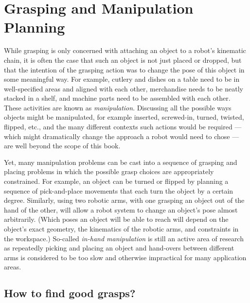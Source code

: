 \chapter{Grasping and Manipulation Planning}\label{chap:manipulation}

While grasping is only concerned with attaching an object to a robot's kinematic chain, it is often the case that such an object is not just placed or dropped, but that the intention of the grasping action was to change the pose of this object in some meaningful way. For example, cutlery and dishes on a table need to be in well-specified areas and aligned with each other, merchandise needs to be neatly stacked in a shelf, and machine parts need to be assembled with each other. These activities are known as \textsl{manipulation}. Discussing all the possible ways objects might be manipulated, for example inserted, screwed-in, turned, twisted, flipped, etc., and the many different contexts such actions would be required --- which might dramatically change the approach a robot would need to chose --- are well beyond the scope of this book.

Yet, many manipulation problems can be cast into a sequence of grasping and placing problems in which the possible grasp choices are appropriately constrained. For example, an object can be turned or flipped by planning a sequence of pick-and-place movements that each turn the object by a certain degree. Similarly, using two robotic arms, with one grasping an object out of the hand of the other, will allow a robot system to change an object's pose almost arbitrarily. (Which poses an object will be able to reach will depend on the object's exact geometry, the kinematics of the robotic arms, and constraints in the workspace.) So-called \textsl{in-hand manipulation} is still an active area of research as  repeatedly picking and placing an object and hand-overs between different arms is considered to be too slow and otherwise impractical for many application areas.

\section{How to find good grasps?}

